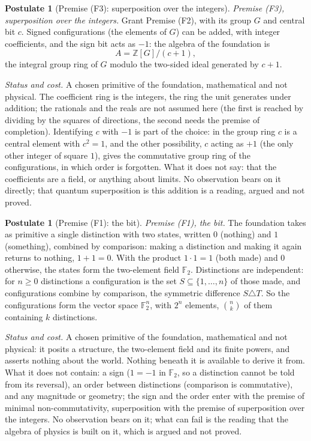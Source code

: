 \documentclass[11pt]{article}
\theoremstyle{definition}
\newtheorem{postulate}[theorem]{Postulate}
\theoremstyle{plain}
\newcommand{\changedmark}[2]{\marginpar{\raggedright\scriptsize\color{#1}#2}}
\providecommand{\Z}{}\renewcommand{\Z}{\mathbb{Z}}
\begin{document}
\begin{postulate}[Premise (F3): superposition over the integers]\label{c:synthesis.premise-superposition-over-the-integers}
\changedmark{BurntOrange}{changed since the deposit}
\emph{Premise (F3), superposition over the integers.} Grant Premise (F2), with its group $G$ and central bit $c$. Signed configurations (the elements of $G$) can be added, with integer coefficients, and the sign bit acts as $-1$: the algebra of the foundation is
\[
A = \Z[G]/(c + 1),
\]
the integral group ring of $G$ modulo the two-sided ideal generated by $c + 1$.

\emph{Status and cost.} A chosen primitive of the foundation, mathematical and not physical. The coefficient ring is the integers, the ring the unit generates under addition; the rationals and the reals are not assumed here (the first is reached by dividing by the squares of directions, the second needs the premise of completion). Identifying $c$ with $-1$ is part of the choice: in the group ring $c$ is a central element with $c^{2} = 1$, and the other possibility, $c$ acting as $+1$ (the only other integer of square $1$), gives the commutative group ring of the configurations, in which order is forgotten. What it does not say: that the coefficients are a field, or anything about limits. No observation bears on it directly; that quantum superposition is this addition is a reading, argued and not proved.
\end{postulate}

\begin{postulate}[Premise (F1): the bit]\label{c:synthesis.premise-the-bit}
\changedmark{BurntOrange}{changed since the deposit}
\emph{Premise (F1), the bit.} The foundation takes as primitive a single distinction with two states, written $0$ (nothing) and $1$ (something), combined by comparison: making a distinction and making it again returns to nothing, $1 + 1 = 0$. With the product $1 \cdot 1 = 1$ (both made) and $0$ otherwise, the states form the two-element field $\mathbb{F}_{2}$. Distinctions are independent: for $n \ge 0$ distinctions a configuration is the set $S \subseteq \{1, \dots, n\}$ of those made, and configurations combine by comparison, the symmetric difference $S \triangle T$. So the configurations form the vector space $\mathbb{F}_{2}^{n}$, with $2^{n}$ elements, $\binom{n}{k}$ of them containing $k$ distinctions.

\emph{Status and cost.} A chosen primitive of the foundation, mathematical and not physical: it posits a structure, the two-element field and its finite powers, and asserts nothing about the world. Nothing beneath it is available to derive it from. What it does not contain: a sign ($1 = -1$ in $\mathbb{F}_{2}$, so a distinction cannot be told from its reversal), an order between distinctions (comparison is commutative), and any magnitude or geometry; the sign and the order enter with the premise of minimal non-commutativity, superposition with the premise of superposition over the integers. No observation bears on it; what can fail is the reading that the algebra of physics is built on it, which is argued and not proved.
\end{postulate}
\end{document}
